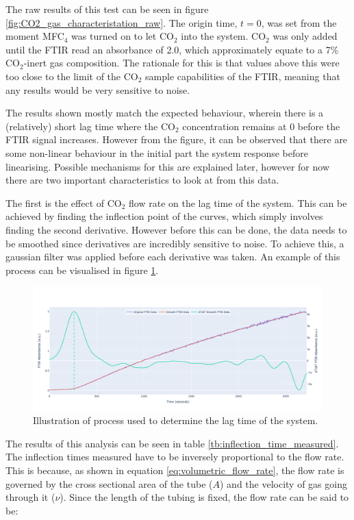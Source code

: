 The raw results of this test can be seen in figure \ref{fig:CO2_gas_characteristation_raw}. The origin time, $t=0$, was set from the moment MFC$_4$ was turned on to let CO$_2$ into the system. CO$_2$ was only added until the FTIR read an absorbance of 2.0, which approximately equate to a 7\% CO$_2$-inert gas composition. The rationale for this is that values above this were too close to the limit of the CO$_2$ sample capabilities of the FTIR, meaning that any results would be very sensitive to noise.

The results shown mostly match the expected behaviour, wherein there is a (relatively) short lag time where the CO$_2$ concentration remains at 0 before the FTIR signal increases. However from the figure, it can be observed that there are some non-linear behaviour in the initial part the system response before linearising. Possible mechanisms for this are explained later, however for now there are two important characteristics to look at from this data. 

The first is the effect of CO$_2$ flow rate on the lag time of the system. This can be achieved by finding the inflection point of the curves, which simply involves finding the second derivative. However before this can be done, the data needs to be smoothed since derivatives are incredibly sensitive to noise. To achieve this, a gaussian filter was applied before each derivative was taken. An example of this process can be visualised in figure \ref{fig:inflection_point_process}. 

\begin{figure}[h!]
	\centering
	\includegraphics[width=\linewidth]{chapter_5/figures/inflection_point_process.png}
	\caption{Illustration of process used to determine the lag time of the system.}
	\label{fig:inflection_point_process}
\end{figure}

The results of this analysis can be seen in table \ref{tb:inflection_time_measured}. The inflection times measured have to be inversely proportional to the flow rate. This is because, as shown in equation \ref{eq:volumetric_flow_rate}, the flow rate is governed by the cross sectional area of the tube ($A$) and the velocity of gas going through it ($\nu$). Since the length of the tubing is fixed, the flow rate can be said to be:

